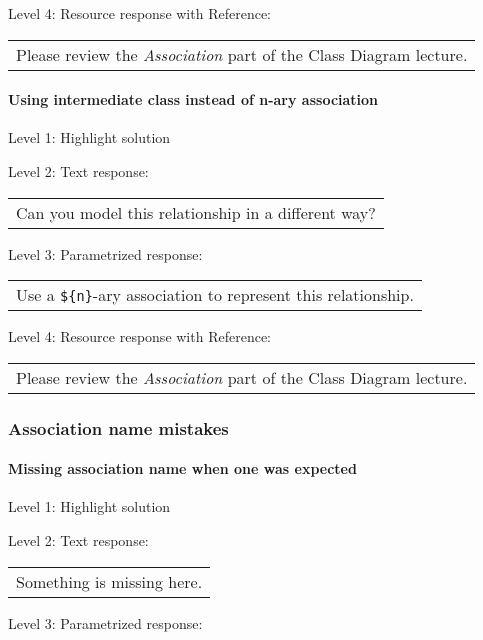 \noindent Level 4: Resource response with Reference:

\begin{tabular}{|c}
Please review the \textit{Association} part of the Class Diagram lecture.
\end{tabular} \medskip


\paragraph{Using intermediate class instead of n-ary association}

\noindent Level 1: Highlight solution \medskip

\noindent Level 2: Text response: \medskip

\begin{tabular}{|c}
Can you model this relationship in a different way?
\end{tabular} \medskip

\noindent Level 3: Parametrized response: \medskip

\begin{tabular}{|c}
Use a \verb|${n}|-ary association to represent this relationship.
\end{tabular} \medskip

\noindent Level 4: Resource response with Reference:

\begin{tabular}{|c}
Please review the \textit{Association} part of the Class Diagram lecture.
\end{tabular} \medskip


\subsubsection{Association name mistakes}

\paragraph{Missing association name when one was expected}

\noindent Level 1: Highlight solution \medskip

\noindent Level 2: Text response: \medskip

\begin{tabular}{|c}
Something is missing here.
\end{tabular} \medskip

\noindent Level 3: Parametrized response: \medskip

